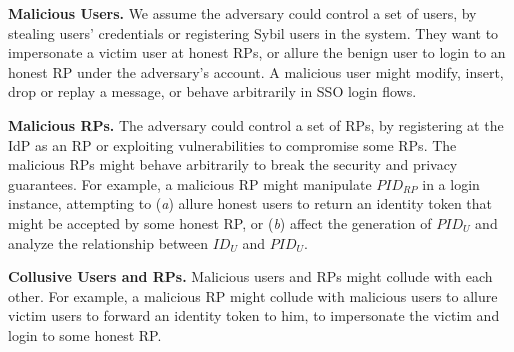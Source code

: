 
\vspace{0.5mm}
\noindent \textbf{Malicious Users.}
We assume the adversary could control a set of users,
 by stealing users' credentials or registering Sybil users in the system.
They want to impersonate a victim user at honest RPs, or allure the benign user to login to an honest RP under the adversary's account.
A malicious user might
    modify, insert, drop or replay a message, or behave arbitrarily in SSO login flows.



\vspace{0.5mm}
\noindent \textbf{Malicious RPs.}
The adversary could control a set of RPs, by registering at the IdP as an RP
     or exploiting vulnerabilities to compromise some RPs.
The malicious RPs might behave arbitrarily to break the security and privacy guarantees.
For example,
a malicious RP might manipulate $PID_{RP}$ in a login instance,
    attempting to (\emph{a}) allure honest users to return an identity token that might be accepted by some honest RP,
or (\emph{b}) affect the generation of $PID_U$ and
    analyze the relationship between $ID_U$ and $PID_U$.


\vspace{0.5mm}
\noindent \textbf{Collusive Users and RPs.} %
Malicious users and RPs might collude with each other.
For example, a malicious RP might collude with malicious users to allure victim users to forward an identity token to him,
    to impersonate the victim and login to some honest RP.

